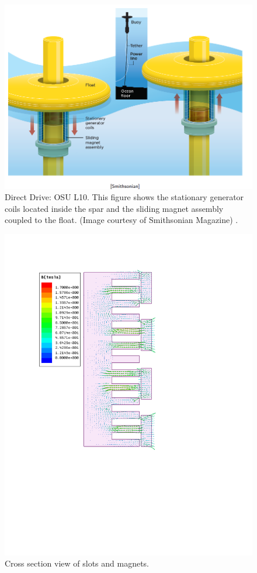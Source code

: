 \documentclass[twocolumn,10pt]{asme2e}
\begin{document}
\begin{figure}[t]
    \centering
    \includegraphics[width=1\columnwidth]{Images/PAWECSmithsonian}
    \caption{Direct Drive: OSU L10. This figure shows the stationary generator coils located inside the spar and the sliding magnet assembly coupled to the float.  (Image courtesy of Smithsonian Magazine) \cite{Rusch:2009aa}.} 
    \label{L10}
    \end{figure}

\begin{figure}[t]
    \centering
    \includegraphics[width=1\columnwidth]{Images/Slots_n_Magnets_Linear}
    \caption{Cross section view of slots and magnets.}
    \label{magnets}
    \end{figure} 
\end{document}
